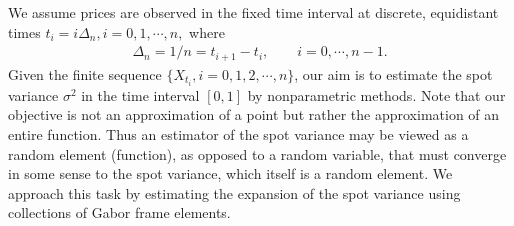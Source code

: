  We assume prices are observed in the fixed time interval \domain at discrete, equidistant times $t_i = i \Delta_n, i= 0,1,\cdots,n, $ where 
 \begin{align}
   \Delta_n = 1/n = t_{i + 1} - t_i, \qquad i = 0, \cdots, n-1.
   \label{}
 \end{align}
 Given the finite sequence  $\{X_{t_i}, i=0,1,2,\cdots,n\}$, our aim is to estimate the spot variance $\sigma^2$ in the time interval $[0,1]$ by nonparametric methods. Note that our objective is not an approximation of a point but rather the approximation of an entire function. Thus an estimator of the spot variance may be viewed as a  random element (function), as opposed to a random variable, that must converge in some sense to the spot variance, which itself is a random element. We approach this task  by estimating the expansion of the spot variance using   collections of  Gabor frame elements.
